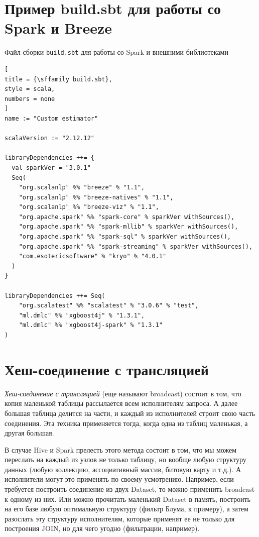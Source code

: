 \documentclass[%
	11pt,
	a4paper,
	utf8,
		]{article}
\begin{document}
\section{Пример build.sbt для работы со Spark и Breeze}

Файл сборки \texttt{build.sbt} для работы со Spark и внешними библиотеками
\begin{lstlisting}[
title = {\sffamily build.sbt},
style = scala,
numbers = none	
]
name := "Custom estimator"

scalaVersion := "2.12.12"

libraryDependencies ++= {
  val sparkVer = "3.0.1"
  Seq(
    "org.scalanlp" %% "breeze" % "1.1",
    "org.scalanlp" %% "breeze-natives" % "1.1",
    "org.scalanlp" %% "breeze-viz" % "1.1",
    "org.apache.spark" %% "spark-core" % sparkVer withSources(),
    "org.apache.spark" %% "spark-mllib" % sparkVer withSources(),
    "org.apache.spark" %% "spark-sql" % sparkVer withSources(),
    "org.apache.spark" %% "spark-streaming" % sparkVer withSources(),
    "com.esotericsoftware" % "kryo" % "4.0.1"
  )
}

libraryDependencies ++= Seq(
    "org.scalatest" %% "scalatest" % "3.0.6" % "test",
    "ml.dmlc" %% "xgboost4j" % "1.3.1",
    "ml.dmlc" %% "xgboost4j-spark" % "1.3.1"
)
\end{lstlisting}

\section{Хеш-соединение с трансляцией}

\emph{Хеш-соединение с трансляцией} (еще называют broadcast) состоит в том, что копия маленькой таблицы рассылается всем исполнителям запроса. А далее большая таблица делится на части, и каждый из исполнителей строит свою часть соединения. Эта техника применяется тогда, когда одна из таблиц маленькая, а другая большая.

В случае Hive и Spark прелесть этого метода состоит в том, что мы можем переслать на каждый из узлов не только таблицу, но вообще любую структуру данных (любую коллекцию, ассоциативный массив, битовую карту и т.д.). А исполнители могут это применять по своему усмотрению. Например, если требуется построить соединение из двух Dataset, то можно применить broadcast к одному из них. Или можно прочитать маленький Dataset в память, построить на его базе любую оптимальную структуру (фильтр Блума, к примеру), а затем разослать эту структуру исполнителям, которые применят ее не только для построения JOIN, но для чего угодно (фильтрации, например). 
\end{document}
